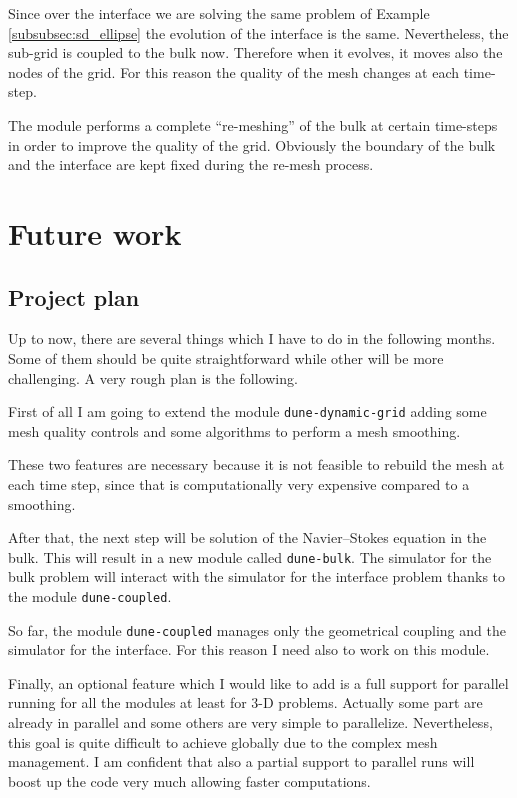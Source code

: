 \documentclass[a4paper,11pt, onecolumn]{article}
\begin{document}
Since over the interface we are solving the same problem of Example
\ref{subsubsec:sd_ellipse} the evolution of the interface is the same.
Nevertheless, the sub-grid is coupled to the bulk now. Therefore when it
evolves, it moves also the nodes of the grid. For this reason the quality of the
mesh changes at each time-step.

The module performs a complete ``re-meshing'' of the bulk at certain time-steps
in order to improve the quality of the grid. Obviously the boundary of the bulk
and the interface are kept fixed during the re-mesh process.

\newpage

\section{Future work}

\subsection{Project plan}

Up to now, there are several things which I have to do in the following months.
Some of them should be quite straightforward while other will be more
challenging. A very rough plan is the following.
\newline

First of all I am going to extend the module \verb|dune-dynamic-grid| adding
some mesh quality controls and some algorithms to perform a mesh smoothing.

These two features are necessary because it is not feasible to rebuild the mesh
at each time step, since that is computationally very expensive compared to a
smoothing.
\newline

After that, the next step will be solution of the Navier--Stokes equation in
the bulk. This will result in a new module called \verb|dune-bulk|. The
simulator for the bulk problem will interact with the simulator for the
interface problem thanks to the module \verb|dune-coupled|.

So far, the module \verb|dune-coupled| manages only the geometrical coupling and
the simulator for the interface. For this reason I need also to work on this
module.
\newline

Finally, an optional feature which I would like to add is a full support for
parallel running for all the modules at least for 3-D problems. Actually some
part are already in parallel and some others are very simple to parallelize.
Nevertheless, this goal is quite difficult to achieve globally due to the
complex mesh management. I am confident that also a partial support to parallel
runs will boost up the code very much allowing faster computations.
\end{document}
